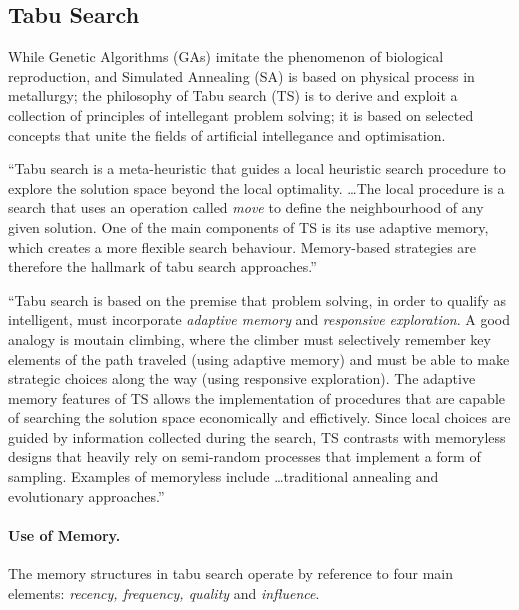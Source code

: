 \clearpage
\subsection{Tabu Search}

While Genetic Algorithms (GAs) imitate the phenomenon of biological reproduction, and Simulated Annealing (SA) is based on physical process in metallurgy; the philosophy of Tabu search (TS) is to derive and exploit a collection of principles of intellegant problem solving; it is based on selected concepts that unite the fields of artificial intellegance and optimisation. \cite{glover97}

``Tabu search is a meta-heuristic that guides a local heuristic search procedure to explore the solution space beyond the local optimality. \ldots The local procedure is a search that uses an operation called \emph{move} to define the neighbourhood of any given solution. One of the main components of TS is its use adaptive memory, which creates a more flexible search behaviour. Memory-based strategies are therefore the hallmark of tabu search approaches.'' \cite{glover97}

``Tabu search is based on the premise that problem solving, in order to qualify as intelligent, must incorporate \emph{adaptive memory} and \emph{responsive exploration}. A good analogy is moutain climbing, where the climber must selectively remember key elements of the path traveled (using adaptive memory) and must be able to make strategic choices along the way (using responsive exploration). The adaptive memory features of TS allows the implementation of procedures that are capable of searching the solution space economically and effictively. Since local choices are guided by information collected during the search, TS contrasts with memoryless designs that heavily rely on semi-random processes that implement a form of sampling. Examples of memoryless include \ldots traditional annealing and evolutionary approaches.'' \cite{glover97}

\paragraph{Use of Memory.} The memory structures in tabu search operate by reference to four main elements: \emph{recency, frequency, quality} and \emph{influence}.

